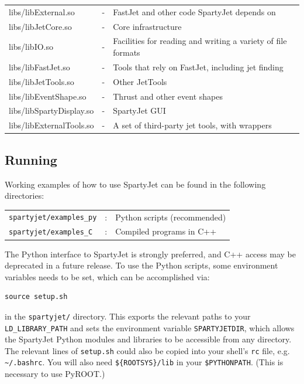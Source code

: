 \documentclass{article}
\newcommand{\prog}[1]{{\sc #1}\xspace}
\newcommand{\code}[1]{{\tt #1}\xspace}
\newcommand{\SJ}[0]{\prog{SpartyJet}}
\newcommand{\FJ}[0]{\prog{FastJet}}
\begin{document}
\begin{tabular}{l c l}
libs/libExternal.so&-&\FJ and other code \SJ depends on\\
libs/libJetCore.so&-&Core infrastructure\\
libs/libIO.so&-&Facilities for reading and writing a variety of file formats\\
libs/libFastJet.so&-&Tools that rely on \FJ, including jet finding\\
libs/libJetTools.so&-&Other JetTools\\
libs/libEventShape.so&-&Thrust and other event shapes\\
libs/libSpartyDisplay.so&-&\SJ GUI\\
libs/libExternalTools.so&-&A set of third-party jet tools, with wrappers\\
\end{tabular}


\subsection{Running}

Working examples of how to use \SJ can be found in the following directories:

\vspace{5pt}

\begin{tabular}{l c l}
\verb+spartyjet/examples_py+ &:& Python scripts (recommended) \\
\verb+spartyjet/examples_C+   &:& Compiled programs in C++ \\
\end {tabular}

\vspace{5pt}

The Python interface to \SJ is strongly preferred, and C++ access may be deprecated in a future release.  To use the Python scripts, some environment variables needs to be set, which can be accomplished via:
\begin{verbatim}
source setup.sh
\end{verbatim}
in the \verb+spartyjet/+ directory.  This exports the relevant paths to your \code{LD\_LIBRARY\_PATH} and sets the environment variable \code{SPARTYJETDIR}, which allows the \SJ Python modules and libraries to be accessible from any directory.  The relevant lines of \verb+setup.sh+ could also be copied into your shell's \verb+rc+ file, e.g. \verb+~/.bashrc+.  You will also need \verb+${ROOTSYS}/lib+ in your \verb+$PYTHONPATH+.  (This is necessary to use PyROOT.)
\end{document}
